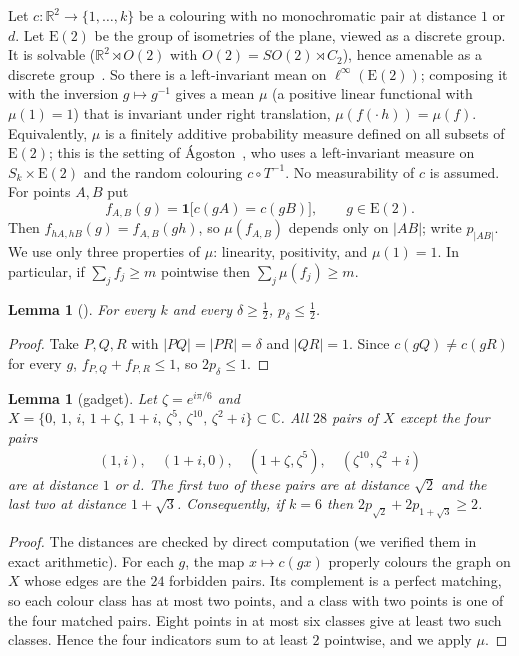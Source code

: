 \documentclass[11pt,a4paper]{amsart}
\newtheorem{lemma}[theorem]{Lemma}
\theoremstyle{remark}
\newcommand{\R}{\mathbb{R}}
\newcommand{\Euc}{\mathrm{E}(2)}
\begin{document}
Let $c\colon\R^2\to\{1,\dots,k\}$ be a colouring with no monochromatic pair at distance $1$ or $d$. Let $\Euc$ be the group of isometries of the plane, viewed as a discrete group. It is solvable ($\R^2\rtimes O(2)$ with $O(2)=SO(2)\rtimes C_2$), hence amenable as a discrete group~\cite{Ru02}. So there is a left-invariant mean on $\ell^\infty(\Euc)$; composing it with the inversion $g\mapsto g^{-1}$ gives a mean $\mu$ (a positive linear functional with $\mu(1)=1$) that is invariant under right translation, $\mu(f(\cdot\,h))=\mu(f)$. Equivalently, $\mu$ is a finitely additive probability measure defined on all subsets of $\Euc$; this is the setting of \'Agoston~\cite[\S4.1]{Ag21}, who uses a left-invariant measure on $S_k\times\Euc$ and the random colouring $c\circ T^{-1}$. No measurability of $c$ is assumed. For points $A,B$ put
\[
f_{A,B}(g)=\mathbf 1\bigl[c(gA)=c(gB)\bigr],\qquad g\in\Euc .
\]
Then $f_{hA,hB}(g)=f_{A,B}(gh)$, so $\mu(f_{A,B})$ depends only on $|AB|$; write $p_{|AB|}$. We use only three properties of $\mu$: linearity, positivity, and $\mu(1)=1$. In particular, if $\sum_j f_j\ge m$ pointwise then $\sum_j\mu(f_j)\ge m$.

\begin{lemma}[{\cite[Prop.~4.2.1]{Ag21}}]\label{lem:half}
For every $k$ and every $\delta\ge\tfrac12$, $p_\delta\le\tfrac12$.
\end{lemma}

\begin{proof}
Take $P,Q,R$ with $|PQ|=|PR|=\delta$ and $|QR|=1$. Since $c(gQ)\ne c(gR)$ for every $g$, $f_{P,Q}+f_{P,R}\le1$, so $2p_\delta\le1$.
\end{proof}

\begin{lemma}[gadget]\label{lem:gadget}
Let $\zeta=e^{i\pi/6}$ and $X=\{0,\,1,\,i,\,1+\zeta,\,1+i,\,\zeta^5,\,\zeta^{10},\,\zeta^2+i\}\subset\mathbb C$. All $28$ pairs of $X$ except the four pairs
\[
(1,i),\quad(1+i,0),\quad(1+\zeta,\zeta^5),\quad(\zeta^{10},\zeta^2+i)
\]
are at distance $1$ or $d$. The first two of these pairs are at distance $\sqrt2$ and the last two at distance $1+\sqrt3$. Consequently, if $k=6$ then $2p_{\sqrt2}+2p_{1+\sqrt3}\ge2$.
\end{lemma}

\begin{proof}
The distances are checked by direct computation (we verified them in exact arithmetic). For each $g$, the map $x\mapsto c(gx)$ properly colours the graph on $X$ whose edges are the $24$ forbidden pairs. Its complement is a perfect matching, so each colour class has at most two points, and a class with two points is one of the four matched pairs. Eight points in at most six classes give at least two such classes. Hence the four indicators sum to at least $2$ pointwise, and we apply $\mu$.
\end{proof}
\end{document}
